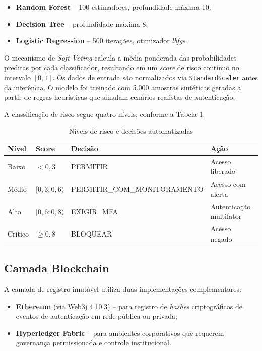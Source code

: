\documentclass[12pt,a4paper]{article}
\begin{document}
\begin{itemize}
    \item \textbf{Random Forest} -- 100 estimadores, profundidade máxima 10;
    \item \textbf{Decision Tree} -- profundidade máxima 8;
    \item \textbf{Logistic Regression} -- 500 iterações, otimizador \textit{lbfgs}.
\end{itemize}

O mecanismo de \textit{Soft Voting} calcula a média ponderada das probabilidades preditas por cada classificador, resultando em um \textit{score} de risco contínuo no intervalo $[0, 1]$. Os dados de entrada são normalizados via \texttt{StandardScaler} antes da inferência. O modelo foi treinado com 5.000 amostras sintéticas geradas a partir de regras heurísticas que simulam cenários realistas de autenticação.

A classificação de risco segue quatro níveis, conforme a Tabela \ref{tab:risk_levels}.

\begin{table}[H]
\centering
\caption{Níveis de risco e decisões automatizadas}
\label{tab:risk_levels}
\begin{tabular}{@{}llll@{}}
\toprule
\textbf{Nível} & \textbf{Score} & \textbf{Decisão} & \textbf{Ação} \\
\midrule
Baixo    & $< 0{,}3$          & PERMITIR                   & Acesso liberado \\
Médio    & $[0{,}3; 0{,}6)$   & PERMITIR\_COM\_MONITORAMENTO & Acesso com alerta \\
Alto     & $[0{,}6; 0{,}8)$   & EXIGIR\_MFA                & Autenticação multifator \\
Crítico  & $\geq 0{,}8$       & BLOQUEAR                   & Acesso negado \\
\bottomrule
\end{tabular}
\end{table}

\subsection{Camada Blockchain}

A camada de registro imutável utiliza duas implementações complementares:

\begin{itemize}
    \item \textbf{Ethereum} (via Web3j 4.10.3) -- para registro de \textit{hashes} criptográficos de eventos de autenticação em rede pública ou privada;
    \item \textbf{Hyperledger Fabric} -- para ambientes corporativos que requerem governança permissionada e controle institucional.
\end{itemize}
\end{document}
